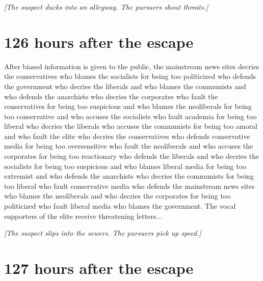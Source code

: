 \documentclass{report}
\begin{document}
\textit{[The suspect ducks into an alleyway. The pursuers shout threats.]}


\section*{126 \small{hours after the escape}}

After biased information is given to the public, the mainstream news sites decries the conservatives who blames the socialists for being too politicized who defends the government who decries the liberals and who blames the communists and who defends the anarchists who decries the corporates who fault the conservatives for being too suspicious and who blames the neoliberals for being too conservative and who accuses the socialists who fault academia for being too liberal who decries the liberals who accuses the communists for being too amoral and who fault the elite who decries the conservatives who defends conservative media for being too oversensitive who fault the neoliberals and who accuses the corporates for being too reactionary who defends the liberals and who decries the socialists for being too suspicious and who blames liberal media for being too extremist and who defends the anarchists who decries the communists for being too liberal who fault conservative media who defends the mainstream news sites who blames the neoliberals and who decries the corporates for being too politicized who fault liberal media who blames the government. The vocal supporters of the elite receive threatening letters...

\textit{[The suspect slips into the sewers. The pursuers pick up speed.]}


\section*{127 \small{hours after the escape}}
\end{document}
